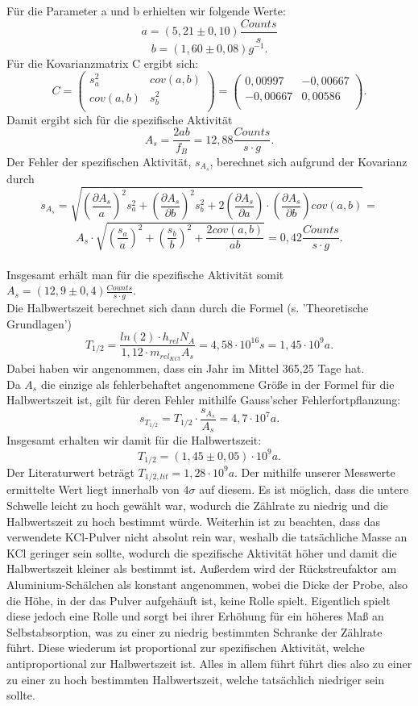  Für die Parameter a und b erhielten wir folgende Werte: \[a=(5,21\pm0,10)\frac{Counts}{s}\]
 \[b=(1,60\pm0,08)g^{-1}.\]  Für die Kovarianzmatrix C ergibt sich:
  \[C=\begin{pmatrix} s_{a}^{2} & cov(a,b) \\ cov(a,b) & s_{b}^{2} \\  \end{pmatrix}=\begin{pmatrix} 0,00997 & -0,00667 \\ -0,00667 & 0,00586 \\  \end{pmatrix}.\] 
  Damit ergibt sich für die spezifische Aktivität \[A_{s}=\frac{2ab}{f_{B}}=12,88 \frac{Counts}{s\cdot g}.\] 
  Der Fehler der spezifischen Aktivität, $s_{A_{s}}$, berechnet sich aufgrund der Kovarianz durch \[s_{A_{s}}=\sqrt{\left(\frac{\partial A_{s}}{a}\right)^{2}s_{a}^{2}+\left(\frac{\partial A_{s}}{\partial b}\right)^{2}s_{b}^{2}+2\left(\frac{\partial A_{s}}{\partial a}\right)\cdot\left(\frac{\partial A_{s}}{\partial b}\right)cov(a,b)}=\]
  \[A_{s}\cdot\sqrt{\left(\frac{s_{a}}{a}\right)^{2}+\left(\frac{s_{b}}{b}\right)^{2}+\frac{2cov(a,b)}{ab}}=0,42 \frac{Counts}{s\cdot g}.\] 
  ~\\
  Insgesamt erhält man für die spezifische Aktivität somit $A_{s}=(12,9\pm0,4)\frac{Counts}{s\cdot g}$.\\
  Die Halbwertszeit berechnet sich dann durch die Formel (s. 'Theoretische Grundlagen') \[T_{1/2}=\frac{ln(2)\cdot h_{rel}N_{A}}{1,12\cdot m_{rel_{KCl}}A_{s}}=4,58\cdot10^{16}s=1,45\cdot10^{9}a.\] Dabei haben wir angenommen, dass ein Jahr im Mittel 365,25 Tage hat.\\
  Da $A_{s}$ die einzige als fehlerbehaftet angenommene Größe in der Formel für die Halbwertszeit ist, gilt für deren Fehler mithilfe Gauss'scher Fehlerfortpflanzung: 
  \[s_{T_{1/2}}=T_{1/2}\cdot\frac{s_{A_{s}}}{A_{s}}=4,7\cdot10^{7}a.\] 
  Insgesamt erhalten wir damit für die Halbwertszeit: \[T_{1/2}=(1,45\pm0,05)\cdot10^{9}a.\] 
  Der Literaturwert beträgt $T_{1/2,lit}=1,28\cdot10^{9}a$. Der mithilfe unserer Messwerte ermittelte Wert liegt innerhalb von $4\sigma$ auf diesem. Es ist möglich, dass die untere Schwelle leicht zu hoch gewählt war, wodurch die Zählrate zu niedrig und die Halbwertszeit zu hoch bestimmt würde. Weiterhin ist zu beachten, dass das verwendete KCl-Pulver nicht absolut rein war, weshalb die tatsächliche Masse an KCl geringer sein sollte, wodurch die spezifische Aktivität höher und damit die Halbwertszeit kleiner als bestimmt ist. Außerdem wird der Rückstreufaktor am Aluminium-Schälchen als konstant angenommen, wobei die Dicke der Probe, also die Höhe, in der das Pulver aufgehäuft ist, keine Rolle spielt. Eigentlich spielt diese jedoch eine Rolle und sorgt bei ihrer Erhöhung für ein höheres Maß an Selbstabsorption, was zu einer zu niedrig bestimmten Schranke der Zählrate führt. Diese wiederum ist proportional zur spezifischen Aktivität, welche antiproportional zur Halbwertszeit ist. Alles in allem führt führt dies also zu einer zu einer zu hoch bestimmten Halbwertszeit, welche tatsächlich niedriger sein sollte. 
  \clearpage
